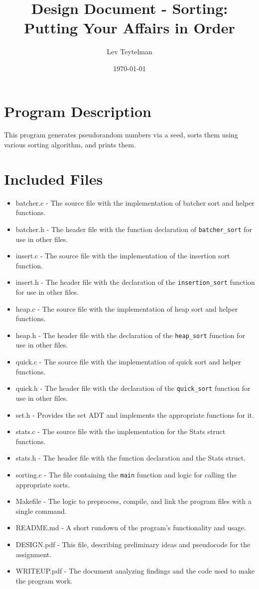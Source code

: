 \documentclass[12pt]{article}
\title{Design Document - Sorting: Putting Your Affairs in Order}
\author{Lev Teytelman}
\date{\today}
\begin{document}
\maketitle
\section{Program Description}

This program generates pseudorandom numbers via a seed, sorts them using various sorting algorithm, and prints them.
\section{Included Files}

\begin{itemize}
    \item batcher.c - The source file with the implementation of batcher sort and helper functions.
    \item batcher.h - The header file with the function declaration of \verb|batcher_sort| for use in other files.
    \item insert.c - The source file with the implementation of the insertion sort function.
    \item insert.h - The header file with the declaration of the \verb|insertion_sort| function for use in other files.
    \item heap.c - The source file with the implementation of heap sort and helper functions.
    \item heap.h - The header file with the declaration of the \verb|heap_sort| function for use in other files.
    \item quick.c - The source file with the implementation of quick sort and helper functions.
    \item quick.h - The header file with the declaration of the \verb|quick_sort| function for use in other files.
    \item set.h - Provides the set ADT and implements the appropriate functions for it.
    \item stats.c - The source file with the implementation for the Stats struct functions.
    \item stats.h - The header file with the function declaration and the Stats struct.
    \item sorting.c - The file containing the \verb|main| function and logic for calling the appropriate sorts.
    \item Makefile - The logic to preprocess, compile, and link the program files with a single command.
    \item README.md - A short rundown of the program's functionality and usage.
    \item DESIGN.pdf - This file, describing preliminary ideas and pseudocode for the assignment.
    \item WRITEUP.pdf - The document analyzing findings and the code used to make the program work.
\end{itemize}
\end{document}
